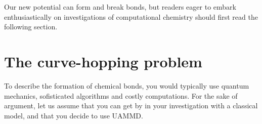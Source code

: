 Our new potential can form and break bonds, but readers eager to embark 
enthusiastically on investigations of computational chemistry should first read 
the following section.

\section{The curve-hopping problem}

To describe the formation of chemical bonds, you would typically use quantum 
mechanics, sofisticated algorithms and costly computations. For the sake of 
argument, let us assume that you can get by in your investigation with a 
classical model, and that you decide to use UAMMD.

